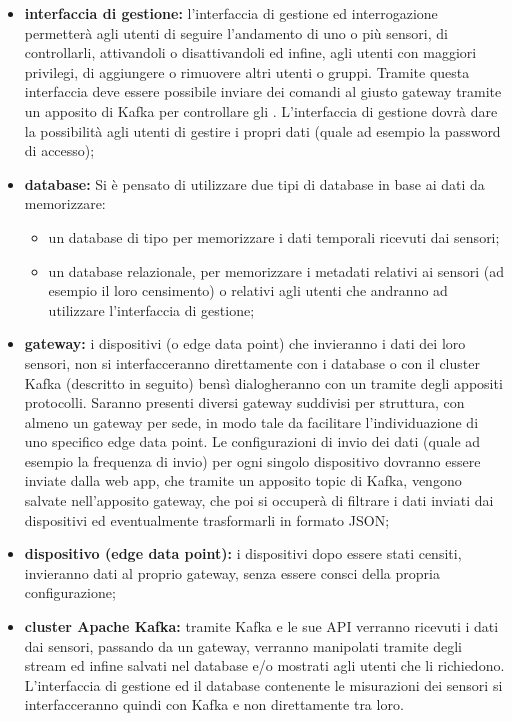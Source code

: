 		\begin{itemize}
			\item \textbf{interfaccia di gestione:} l'interfaccia di gestione ed interrogazione permetterà agli utenti di seguire l'andamento di uno o più sensori, di controllarli, attivandoli o disattivandoli ed infine, agli utenti con maggiori privilegi, di aggiungere o rimuovere altri utenti o gruppi.
			Tramite questa interfaccia deve essere possibile inviare dei comandi al giusto gateway tramite un apposito  di Kafka per controllare gli . 
			L'interfaccia di gestione dovrà dare la possibilità agli utenti di gestire i propri dati (quale ad esempio la password di accesso);
			\item \textbf{database:} Si è pensato di utilizzare due tipi di database in base ai dati da memorizzare:
			\begin{itemize}
				\item un database di tipo  per memorizzare i dati temporali ricevuti dai sensori;
				\item un database relazionale, per memorizzare i metadati relativi ai sensori (ad esempio il loro censimento) o relativi agli utenti che andranno ad utilizzare l'interfaccia di gestione;
			\end{itemize}

			\item \textbf{gateway:} i dispositivi (o edge data point) che invieranno i dati dei loro sensori, non si interfacceranno direttamente con i database o con il cluster Kafka (descritto in seguito) bensì dialogheranno con un  tramite degli appositi protocolli.
			Saranno presenti diversi gateway suddivisi per struttura, con almeno un gateway per sede, in modo tale da facilitare l'individuazione di uno specifico edge data point.
			Le configurazioni di invio dei dati (quale ad esempio la frequenza di invio) per ogni singolo dispositivo dovranno essere inviate dalla web app, che tramite un apposito topic di Kafka, vengono salvate nell'apposito gateway, che poi si occuperà di filtrare i dati inviati dai dispositivi ed eventualmente trasformarli in formato JSON;

			\item \textbf{dispositivo (edge data point):} i dispositivi dopo essere stati censiti, invieranno dati al proprio gateway, senza essere consci della propria configurazione;

			\item \textbf{cluster Apache Kafka:} tramite Kafka e le sue API verranno ricevuti i dati dai sensori, passando da un gateway, verranno manipolati tramite degli stream ed infine salvati nel database e/o mostrati agli utenti che li richiedono. L'interfaccia di gestione ed il database contenente le misurazioni dei sensori si interfacceranno quindi con Kafka e non direttamente tra loro.

		\end{itemize}
